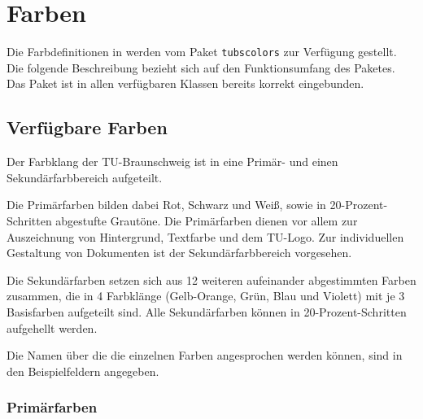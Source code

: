 \chapter{Farben}

\newcommand{\classoptionitem}[1][ ]{
  \item[\mdseries{\ttfamily%
    \textbackslash usepackage%
    {[{\color{tuRed}#1}]}%
    \{tubslogo\}}]\hfill\\
}

Die Farbdefinitionen in \tubslatex werden vom Paket \lstinline{tubscolors}
zur Verfügung gestellt. Die folgende Beschreibung bezieht sich
auf den Funktionsumfang des Paketes. Das Paket ist in allen verfügbaren
Klassen bereits korrekt eingebunden.

\newcommand{\rainbow}[2][\relax]{{\noindent\sffamily\footnotesize%
\ifx#1\relax\colorlet{fglbg}{black}\else\colorlet{fglbg}{#1}\fi
\colorbox{#2100}{\hbox to 0.188\textwidth{%
  \color{fglbg}\vphantom{Fg}#2{}100\hfill}}%
\colorbox{#280}{\hbox to 0.188\textwidth{%
  \color{fglbg}\vphantom{Fg}#2{}80\hfill}}%
\colorbox{#260}{\hbox to 0.188\textwidth{\vphantom{Fg}#2{}60\hfill}}%
\colorbox{#240}{\hbox to 0.188\textwidth{\vphantom{Fg}#2{}40\hfill}}%
\colorbox{#220}{\hbox to 0.188\textwidth{\vphantom{Fg}#2{}20\hfill}}\\%
}}

\section{Verfügbare Farben}

Der Farbklang der TU-Braunschweig ist in eine Primär- und einen
Sekundärfarbbereich aufgeteilt.

Die Primärfarben bilden dabei Rot, Schwarz und Weiß, sowie in
20-Prozent-Schritten abgestufte Grautöne. Die Primärfarben dienen
vor allem zur Auszeichnung von Hintergrund, Textfarbe und dem TU-Logo.
Zur individuellen Gestaltung von Dokumenten ist der Sekundärfarbbereich
vorgesehen.

Die Sekundärfarben setzen sich aus 12 weiteren aufeinander abgestimmten
Farben zusammen, die 
in 4 Farbklänge (Gelb-Orange, Grün, Blau und Violett) mit je 3 Basisfarben
aufgeteilt sind.
Alle Sekundärfarben können in 20-Prozent-Schritten aufgehellt werden.

Die Namen über die die einzelnen Farben angesprochen werden können, sind in den
Beispielfeldern angegeben.

\subsection{Primärfarben}


